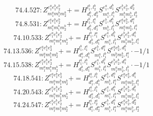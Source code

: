 \documentclass[letterpaper,10pt,fleqn,leqno,onecolumn]{article}
\begin{document}
\begin{equation} \;\;\;\;\;\;  74.4.527: Z^{e_{1}^{a}e_{1}^{b}e_{2}^{b}}_{m_{1}^{a}m_{1}^{b}m_{2}^{b}}+=H^{l_{1}^{b},l_{2}^{b}}_{d_{1}^{b},d_{2}^{b}}S^{e_{1}^{a},d_{1}^{b}}_{m_{1}^{a},l_{1}^{b}}S^{e_{1}^{b}e_{2}^{b},d_{2}^{b}}_{m_{1}^{b}m_{2}^{b},l_{2}^{b}} \end{equation}
\begin{equation} \;\;\;\;\;\;  74.8.531: Z^{e_{1}^{a}e_{1}^{b}e_{2}^{b}}_{m_{1}^{a}m_{1}^{b}m_{2}^{b}}+=H^{l_{1}^{b},l_{1}^{a}}_{d_{1}^{b},d_{1}^{a}}S^{e_{1}^{b},d_{1}^{b}}_{m_{1}^{b},l_{1}^{b}}S^{e_{1}^{a}e_{2}^{b},d_{1}^{a}}_{m_{1}^{a}m_{2}^{b},l_{1}^{a}} \end{equation}
\begin{equation} \;\;\;\;\;\;  74.10.533: Z^{e_{1}^{a}e_{1}^{b}e_{2}^{b}}_{m_{1}^{a}m_{1}^{b}m_{2}^{b}}+=H^{l_{1}^{b},l_{1}^{a}}_{d_{1}^{b},d_{1}^{a}}S^{e_{1}^{a},d_{1}^{b}}_{m_{1}^{a},l_{1}^{b}}S^{e_{1}^{b}e_{2}^{b},d_{1}^{a}}_{m_{1}^{b}m_{2}^{b},l_{1}^{a}} \end{equation}
\begin{equation} \;\;\;\;\;\;  74.13.536: Z^{e_{1}^{a}e_{1}^{b}e_{2}^{b}}_{m_{1}^{a}m_{1}^{b}m_{2}^{b}}+=H^{l_{1}^{b},l_{1}^{a}}_{d_{1}^{a},d_{1}^{b}}S^{e_{1}^{b},d_{1}^{a}}_{m_{1}^{a},l_{1}^{b}}S^{e_{1}^{a}e_{2}^{b},d_{1}^{b}}_{m_{1}^{b}m_{2}^{b},l_{1}^{a}}\cdot -1/1 \end{equation}
\begin{equation} \;\;\;\;\;\;  74.15.538: Z^{e_{1}^{a}e_{1}^{b}e_{2}^{b}}_{m_{1}^{a}m_{1}^{b}m_{2}^{b}}+=H^{l_{1}^{a},l_{1}^{b}}_{d_{1}^{b},d_{1}^{a}}S^{e_{1}^{a},d_{1}^{b}}_{m_{1}^{b},l_{1}^{a}}S^{e_{1}^{b}e_{2}^{b},d_{1}^{a}}_{m_{1}^{a}m_{2}^{b},l_{1}^{b}}\cdot -1/1 \end{equation}
\begin{equation} \;\;\;\;\;\;  74.18.541: Z^{e_{1}^{a}e_{1}^{b}e_{2}^{b}}_{m_{1}^{a}m_{1}^{b}m_{2}^{b}}+=H^{l_{1}^{a},l_{1}^{b}}_{d_{1}^{a},d_{1}^{b}}S^{e_{1}^{b},d_{1}^{a}}_{m_{1}^{b},l_{1}^{a}}S^{e_{1}^{a}e_{2}^{b},d_{1}^{b}}_{m_{1}^{a}m_{2}^{b},l_{1}^{b}} \end{equation}
\begin{equation} \;\;\;\;\;\;  74.20.543: Z^{e_{1}^{a}e_{1}^{b}e_{2}^{b}}_{m_{1}^{a}m_{1}^{b}m_{2}^{b}}+=H^{l_{1}^{a},l_{1}^{b}}_{d_{1}^{a},d_{1}^{b}}S^{e_{1}^{a},d_{1}^{a}}_{m_{1}^{a},l_{1}^{a}}S^{e_{1}^{b}e_{2}^{b},d_{1}^{b}}_{m_{1}^{b}m_{2}^{b},l_{1}^{b}} \end{equation}
\begin{equation} \;\;\;\;\;\;  74.24.547: Z^{e_{1}^{a}e_{1}^{b}e_{2}^{b}}_{m_{1}^{a}m_{1}^{b}m_{2}^{b}}+=H^{l_{1}^{a},l_{2}^{a}}_{d_{1}^{a},d_{2}^{a}}S^{e_{1}^{b},d_{1}^{a}}_{m_{1}^{b},l_{1}^{a}}S^{e_{1}^{a}e_{2}^{b},d_{2}^{a}}_{m_{1}^{a}m_{2}^{b},l_{2}^{a}} \end{equation}
\end{document}
